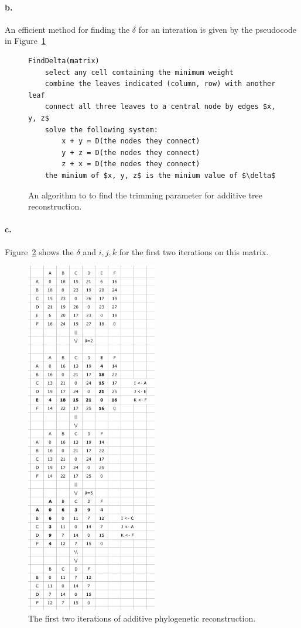 \documentclass[12pt]{article}
\begin{document}
\paragraph{b.} %
An efficient method for finding the $\delta$ for an interation is given by the pseudocode in Figure~\ref{finddelta}

\begin{figure}[htb]
\centering
\begin{lstlisting}
FindDelta(matrix)
	select any cell comtaining the minimum weight
	combine the leaves indicated (column, row) with another leaf
	connect all three leaves to a central node by edges $x, y, z$
	solve the following system:
		x + y = D(the nodes they connect)
		y + z = D(the nodes they connect)
		z + x = D(the nodes they connect)
	the minium of $x, y, z$ is the minium value of $\delta$
\end{lstlisting}
	\caption{An algorithm to to find the trimming parameter for additive tree reconstruction.}
	\label{finddelta}
\end{figure}

\paragraph{c.} %
Figure~\ref{twoiter} shows the $\delta$ and $i,j,k$ for the first two iterations on this matrix.

\begin{figure}[htb]
	\begin{center}
		\includegraphics[width=2.25in]{twoiter}
	\end{center}
	\caption{The first two iterations of additive phylogenetic reconstruction.}
	\label{twoiter}
\end{figure}
\end{document}
